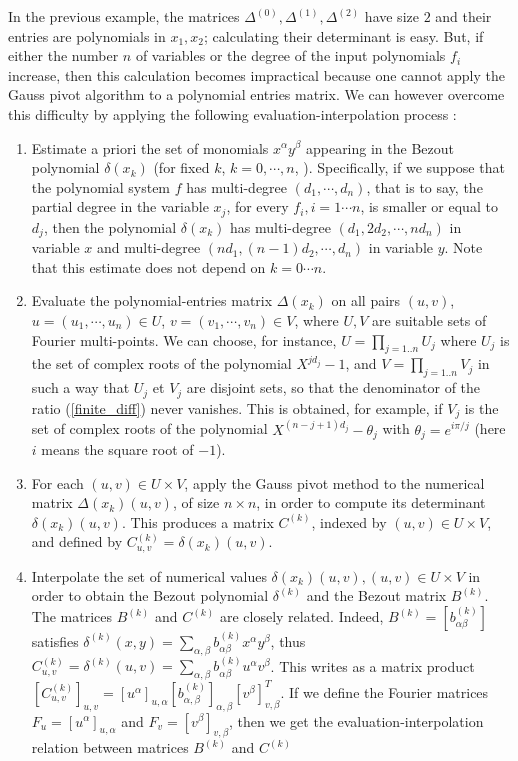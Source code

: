 \documentclass{standalone}
\begin{document}
In the previous example, the matrices $\Delta^{(0)}, \Delta^{(1)}, \Delta^{(2)}$ have size $2$ and their entries are polynomials in $x_1, x_2$; calculating their determinant is easy. But, if either the number  $n$ of variables or the degree of the input polynomials $f_i$ increase, then this calculation becomes impractical because one cannot apply the Gauss pivot algorithm to a polynomial entries matrix. We can however overcome this difficulty by applying the following evaluation-interpolation process :
\begin{enumerate}
\item
Estimate a priori the set of monomials $x^\alpha y^\beta$ appearing in the Bezout polynomial $\delta(x_k)$ (for fixed $k$, $k = 0,\cdots, n$, ). Specifically, if we suppose that the polynomial system $f$ has multi-degree $(d_1, \cdots, d_n)$, that is to say, the partial degree in the variable $x_j$, for every $f_i, i = 1\cdots n$, is smaller or equal to $d_j$, then the polynomial $\delta(x_k)$ has multi-degree $(d_1, 2d_2, \cdots, nd_n)$ in variable $x$ and multi-degree $(nd_1, (n-1)d_2, \cdots, d_n)$ in variable $y$. Note that this estimate does not depend on $k = 0\cdots n$.
\item
Evaluate the polynomial-entries matrix $\Delta(x_k)$ on all pairs $(u, v)$, $u = (u_1,\cdots, u_n) \in U$, $v = (v_1,\cdots, v_n) \in V$, where $U, V$ are suitable sets of Fourier multi-points. We can choose, for instance, $U = \prod_{j=1..n} U_j$ where $U_j$ is the set of complex roots of the polynomial $X^{jd_j} - 1$, and $V = \prod_{j=1..n} V_j$ in such a way that $U_j$ et $V_j$ are disjoint sets, so that the denominator of the ratio (\ref{finite_diff}) never vanishes. This is obtained, for example, if $V_j$ is the set of complex roots of the polynomial $X^{(n-j+1)d_j} - \theta_j$ with $\theta_j = e^{i\pi/j}$ (here $i$ means the square root of $-1$). 
\item
For each $(u, v) \in U\times V$, apply the Gauss pivot method to the numerical matrix $\Delta(x_k)(u, v)$, of size $n\times n$, in order to compute its determinant $\delta(x_k)(u, v)$. This produces a matrix $C^{(k)}$, indexed by $(u, v) \in U\times V$, and defined by $C^{(k)}_{u, v} = \delta(x_k)(u, v)$.
\item
Interpolate the set of numerical values $\delta(x_k)(u, v), (u, v) \in U\times V$ in order to obtain the Bezout polynomial $\delta^{(k)}$ and the Bezout matrix $B^{(k)}$. The matrices $B^{(k)}$ and $C^{(k)}$ are closely related. Indeed, $B^{(k)} = \left[b^{(k)}_{\alpha\beta}\right]$ satisfies $\delta^{(k)}(x, y) = \sum_{\alpha,\beta} b^{(k)}_{\alpha\beta} x^\alpha y^\beta$, thus $C^{(k)}_{u,v} = \delta^{(k)}(u, v) = \sum_{\alpha,\beta} b^{(k)}_{\alpha\beta} u^\alpha v^\beta$. This writes as a matrix product $\left[C^{(k)}_{u,v}\right]_{u,v} = \left[u^\alpha\right]_{u,\alpha} \left[b^{(k)}_{\alpha,\beta}\right]_{\alpha, \beta} \left[v^\beta\right]_{v, \beta}^T$. If we define the Fourier matrices $F_u = \left[ u^\alpha \right]_{u, \alpha}$ and $F_v = \left[ v^\beta \right]_{v, \beta}$, then we get the evaluation-interpolation relation between matrices $B^{(k)}$ and $C^{(k)}$

\end{enumerate}
\end{document}
